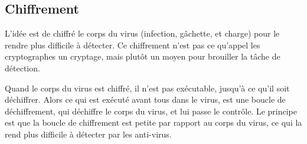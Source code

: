     \subsection{Chiffrement}
    L'idée est de chiffré le corps du virus (infection, gâchette, et charge) pour le rendre plus difficile à 
    détecter. Ce chiffrement n'est pas ce qu'appel les cryptographes un cryptage, mais plutôt un moyen pour
    brouiller la tâche de détection. \cite{virus} %

    Quand le corps du virus est chiffré, il n'est pas exécutable, jusqu'à ce qu'il soit déchiffrer. Alors ce qui est 
    exécuté avant tous dans le virus, est une boucle de déchiffrement, qui déchiffre le corps du virus, et lui passe 
    le contrôle. Le principe est que la boucle de chiffrement est petite par rapport au corps du virus, ce qui la
    rend plus difficile à détecter par les anti-virus. \cite{virus} %

